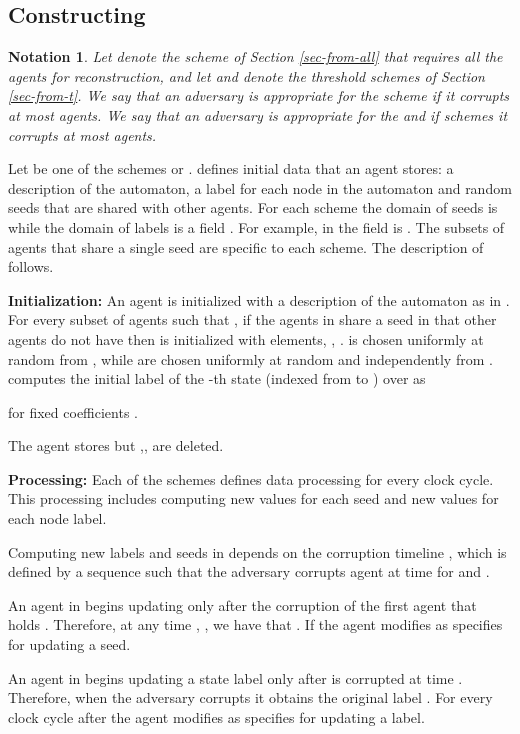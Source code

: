 \documentclass[letterpaper,11pt]{article}
\newtheorem{notation}{Notation}
\begin{document}
\subsection{Constructing }

\begin{notation}
Let  denote the scheme of Section \ref{sec-from-all} that
requires all the agents for reconstruction, and let  
and 
denote the threshold schemes of Section \ref{sec-from-t}. We say that
an adversary is {\em appropriate} for the scheme  if it
corrupts at most  agents. We say that an adversary is {\em
appropriate} for the  and  if schemes it corrupts
at most  agents.
\end{notation}


Let  be one of the schemes  or .  defines initial data that an agent  stores: a description of the automaton, a label for each node in the automaton and random seeds that are shared with other agents. For each scheme the domain of seeds is  while the domain of labels is a field . For example, in  the field is . The subsets of agents that share a single seed are specific to each scheme. The description of  follows.

\smallskip
\noindent
{\bf Initialization:} An agent  is initialized with a description of the automaton as in . For every subset of agents  such that , if the agents in  share a seed in  that other agents do not have then  is initialized with  elements, , .  is chosen uniformly at random from , while  are chosen uniformly at random and independently from .  computes the initial label of the -th state (indexed from  to ) over  as 

for fixed coefficients .

The agent stores  but ,, are deleted.

\smallskip
\noindent
{\bf Processing:} Each of the schemes  defines data processing for every clock cycle. This processing includes computing new values for each seed and new values for each node label. 

Computing new labels and seeds in  depends on the corruption timeline , which is defined by a sequence  such that the adversary corrupts agent  at time  for  and . 

An agent  in  begins updating  only after the corruption of the first agent  that holds . Therefore, at any time , , we have that . If  the agent modifies  as  specifies for updating a seed.
 
An agent  in  begins updating a state label  only after  is corrupted at time . Therefore, when the adversary corrupts  it obtains the original label . For every clock cycle after  the agent modifies  as  specifies for updating a label.
\end{document}
